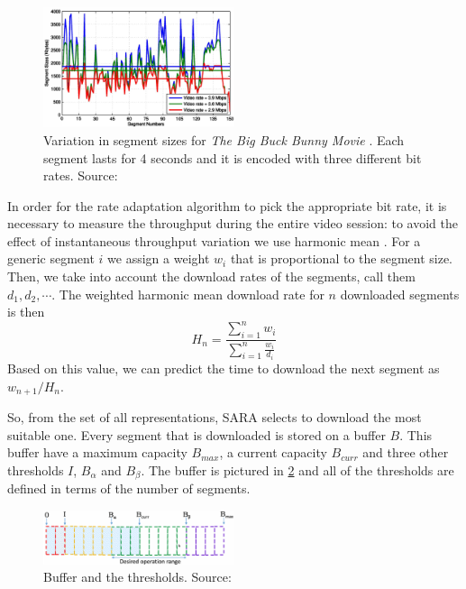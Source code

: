\documentclass[openany]{book}
\begin{document}
\begin{figure}[ht]
\centering
\includegraphics[width=0.5\textwidth]{sara_segment_numbers}
\caption{Variation in segment sizes for \textit{The Big Buck Bunny Movie }\cite{BBB}. Each segment lasts for 4 seconds and it is encoded with three different bit rates. Source: \cite{SARA}}\label{fig:segnumb}
\end{figure}

In order for the rate adaptation algorithm to pick the appropriate bit rate, it is necessary to measure the throughput during the entire video session: to avoid the effect of instantaneous throughput variation we use harmonic mean \cite{SARA}. For a generic segment $i$ we assign a weight $w_i$ that is proportional to the segment size. Then, we take into account the download rates of the segments, call them $d_1, d_2, \cdots$. The weighted harmonic mean download rate for $n$ downloaded segments is then
\[
H_n=\frac{\sum_{i=1}^n w_i}{\sum_{i=1}^n \frac{w_i}{d_i}}
\]
Based on this value, we can predict the time to download the next segment as $w_{n+1}/H_n$.

So, from the set of all representations, SARA selects to download the most suitable one. Every segment that is downloaded is stored on a buffer $B$. This buffer have a maximum capacity $B_{max}$, a current capacity $B_{curr}$ and three other thresholds $I$, $B_{\alpha}$ and $B_{\beta}$. The buffer is pictured in \ref{fig:sarabuffer} and all of the thresholds are defined in terms of the number of segments.

\begin{figure}[ht]
\centering
\includegraphics[width=0.5\textwidth]{sara_buffer_thresholds}
\caption{Buffer and the thresholds. Source: \cite{SARA}}\label{fig:sarabuffer}
\end{figure}
\end{document}

